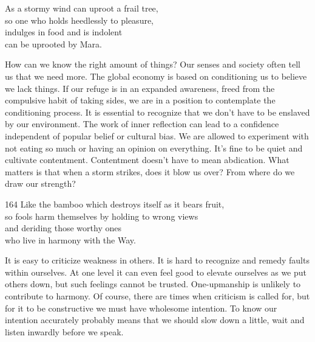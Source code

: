 
\begin{dhpVerse}{7}
\label{dhp-7}
As a stormy wind can uproot a frail tree,\\
so one who holds heedlessly to pleasure,\\
indulges in food and is indolent\\
can be uprooted by Mara.
\end{dhpVerse}

\begin{dhpRefl}
  How can we know the right amount of things? Our senses and society often tell
  us that we need more. The global economy is based on conditioning us to
  believe we lack things. If our refuge is in an expanded awareness, freed from
  the compulsive habit of taking sides, we are in a position to contemplate the
  conditioning process. It is essential to recognize that we don’t have to be
  enslaved by our environment. The work of inner reflection can lead to a
  confidence independent of popular belief or cultural bias. We are allowed to
  experiment with not eating so much or having an opinion on everything. It’s
  fine to be quiet and cultivate contentment. Contentment doesn’t have to mean
  abdication. What matters is that when a storm strikes, does it blow us over?
  From where do we draw our strength?
\end{dhpRefl}


\begin{dhpVerse}{164}
\label{dhp-164}
Like the bamboo which destroys itself as it bears fruit,\\
so fools harm themselves by holding to wrong views\\
and deriding those worthy ones\\
who live in harmony with the Way.
\end{dhpVerse}

\begin{dhpRefl}
  It is easy to criticize weakness in others. It is hard to recognize and remedy
  faults within ourselves. At one level it can even feel good to elevate
  ourselves as we put others down, but such feelings cannot be trusted.
  One-upmanship is unlikely to contribute to harmony. Of course, there are times
  when criticism is called for, but for it to be constructive we must have
  wholesome intention. To know our intention accurately probably means that we
  should slow down a little, wait and listen inwardly before we speak.
\end{dhpRefl}

